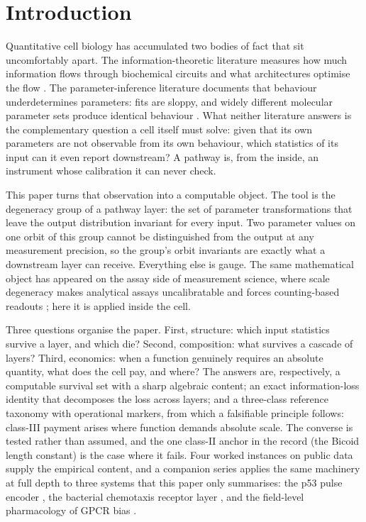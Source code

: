 \documentclass[11pt,a4paper]{article}
\begin{document}
\section{Introduction}

Quantitative cell biology has accumulated two bodies of fact that sit uncomfortably apart. The information-theoretic literature measures how much information flows through biochemical circuits and what architectures optimise the flow \cite{Tkacik2025,Cheong2011,Selimkhanov2014,Bowsher2014,Govern2014}. The parameter-inference literature documents that behaviour underdetermines parameters: fits are sloppy, and widely different molecular parameter sets produce identical behaviour \cite{Gutenkunst2007,Prinz2004,Goaillard2021}. What neither literature answers is the complementary question a cell itself must solve: given that its own parameters are not observable from its own behaviour, which statistics of its input can it even report downstream? A pathway is, from the inside, an instrument whose calibration it can never check.

This paper turns that observation into a computable object. The tool is the degeneracy group of a pathway layer: the set of parameter transformations that leave the output distribution invariant for every input. Two parameter values on one orbit of this group cannot be distinguished from the output at any measurement precision, so the group's orbit invariants are exactly what a downstream layer can receive. Everything else is gauge. The same mathematical object has appeared on the assay side of measurement science, where scale degeneracy makes analytical assays uncalibratable and forces counting-based readouts \cite{Guo2026,Vogelstein1999}; here it is applied inside the cell.

Three questions organise the paper. First, structure: which input statistics survive a layer, and which die? Second, composition: what survives a cascade of layers? Third, economics: when a function genuinely requires an absolute quantity, what does the cell pay, and where? The answers are, respectively, a computable survival set with a sharp algebraic content; an exact information-loss identity that decomposes the loss across layers; and a three-class reference taxonomy with operational markers, from which a falsifiable principle follows: class-III payment arises where function demands absolute scale. The converse is tested rather than assumed, and the one class-II anchor in the record (the Bicoid length constant) is the case where it fails. Four worked instances on public data supply the empirical content, and a companion series applies the same machinery at full depth to three systems that this paper only summarises: the p53 pulse encoder \cite{CompanionP53}, the bacterial chemotaxis receptor layer \cite{CompanionChemo}, and the field-level pharmacology of GPCR bias \cite{CompanionGPCR}.
\end{document}

